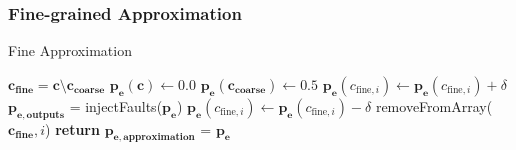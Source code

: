 \documentclass[10pt,twocolumn]{IEEEtran} %
\begin{document}
\subsubsection{\bf{Fine-grained Approximation}}
\begin{algorithm}[b]
  \caption{Fine Approximation}\label{alg:fine_approximation}
  \begin{algorithmic}[1]
    \State $\mathbf{c_{fine}} = \mathbf{c} \setminus \mathbf{c_{coarse}}$
    \State $\mathbf{p_e}(\mathbf{c}) \gets 0.0$
    \State $\mathbf{p_e}(\mathbf{c_{coarse}}) \gets 0.5$
    \State $\mathbf{p_e}(c_{\textrm{fine},i}) \gets \mathbf{p_e}(c_{\textrm{fine},i}) + \delta$
    \State $\mathbf{p_{e,outputs}}$ = injectFaults($\mathbf{p_e}$)
    \State $\mathbf{p_e}(c_{\textrm{fine},i}) \gets \mathbf{p_e}(c_{\textrm{fine},i}) - \delta$
    \State removeFromArray($\mathbf{c_{fine}},i$)
    \EndIf
    \EndFor
    \EndWhile
    \State \textbf{return} $\mathbf{p_{e,approximation}}$ = $\mathbf{p_e}$
    \EndProcedure
  \end{algorithmic}
\end{algorithm}
\end{document}
